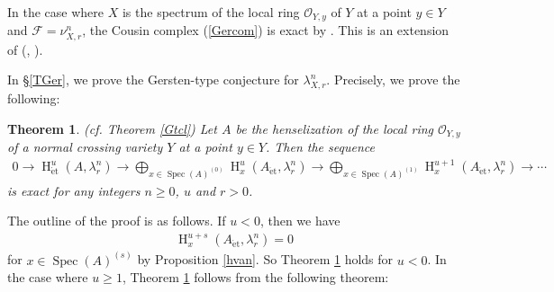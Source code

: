 \documentclass{article}
\newtheorem{thm}{\indent \sc Theorem}[section]
\newcommand{\spec}{\operatorname{Spec}}
\newcommand{\et}{\mathrm{\acute{e}t}}
\newcommand{\HO}{\operatorname{H}}
\begin{document}
In the case where $X$ is the spectrum of the local ring $\mathcal{O}_{Y, y}$ of $Y$ at a point $y\in Y$ and
$\mathcal{F}=\nu^{n}_{X, r}$, 
the Cousin complex (\ref{Gercom}) is exact by \cite[Theorem 1.1]{Sak4}. 
This is an extension of (\cite[Th\'{e}or\`{e}me 1.4]{G-S}, \cite[p.600, Theorem 4.1]{Sh}).

In \S \ref{TGer}, we prove the Gersten-type conjecture for $\lambda_{X, r}^{n}$. Precisely, we prove the following:

%
\begin{thm}\upshape\label{MaiGCL}(cf. Theorem \ref{Gtcl})
Let $A$ be the henselization of the local ring
$\mathcal{O}_{Y, y}$ of a normal crossing variety $Y$ at a point $y\in Y$. 
Then the sequence
%
\begin{align*}
0\to \HO^{u}_{\et}(A, \lambda^{n}_{r})
\to
\bigoplus_{x\in \spec(A)^{(0)}}
\HO^{u}_{x}(A_{\et}, \lambda_{r}^{n})
\to
\bigoplus_{x\in \spec(A)^{(1)}}
\HO^{u+1}_{x}(A_{\et}, \lambda_{r}^{n}) 
\to
\cdots
\end{align*}
%
is exact for any integers $n\geq 0$, $u$ and $r>0$.
\end{thm}
%

The outline of the proof is as follows. If $u<0$, then we have
%
\begin{align*}
\HO^{u+s}_{x}(A_{\et}, \lambda_{r}^{n})
=0
\end{align*}
%
for $x\in \spec(A)^{(s)}$
by Proposition \ref{hvan}. So Theorem \ref{MaiGCL} holds
for $u<0$.
In the case where $u\geq 1$,
Theorem \ref{MaiGCL} follows from the following theorem:
\end{document}
